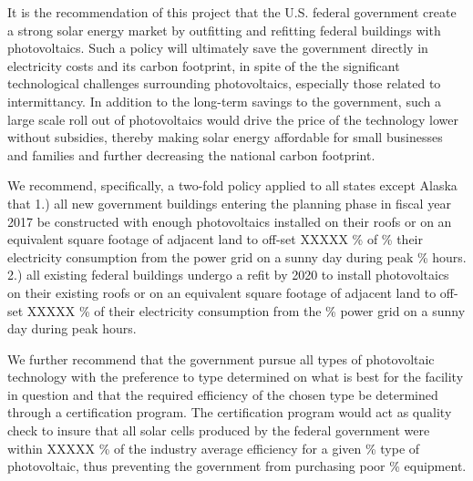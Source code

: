 It is the recommendation of this project that the U.S. federal government 
create a strong solar energy market by outfitting and refitting federal
buildings with photovoltaics. Such a policy will ultimately save the government
directly in electricity costs and its carbon footprint, in spite of the the
significant technological challenges surrounding photovoltaics, especially
those related to intermittancy. In addition to the long-term savings to the
government, such a large scale roll out of photovoltaics would drive the price
of the technology lower without subsidies, thereby making solar energy
affordable for small businesses and families and further decreasing the
national carbon footprint.

We recommend, specifically, a two-fold policy applied to all states except
Alaska that 1.) all new government buildings entering the planning phase in
fiscal year 2017 be constructed with enough photovoltaics installed on their
roofs or on an equivalent square footage of adjacent land to off-set XXXXX \% of
\% their electricity consumption from the power grid on a sunny day during peak
\% hours.
2.) all existing federal buildings undergo a refit by 2020 to install
photovoltaics on their existing roofs or on an equivalent square footage of
adjacent land to off-set XXXXX \% of their electricity consumption from the
\% power grid on a sunny day during peak hours.

We further recommend that the government pursue all types of photovoltaic
technology with the preference to type determined on what is best for the
facility in question and that the required efficiency of the chosen type be
determined through a certification program. The certification program would act
as quality check to insure that all solar cells produced by the federal
government were within XXXXX \% of the industry average efficiency for a given
\% type of photovoltaic, thus preventing the government from purchasing poor
\% equipment.
